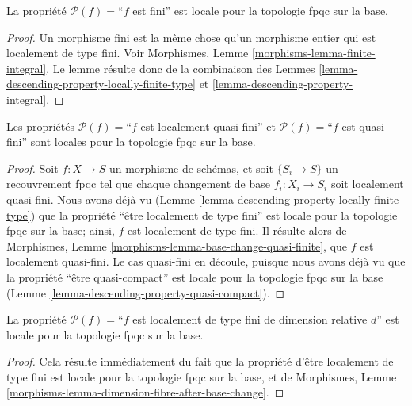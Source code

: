 \begin{lemma}
\label{lemma-descending-property-finite}
La propriété $\mathcal{P}(f) =$``$f$ est fini''
est locale pour la topologie fpqc sur la base.
\end{lemma}

\begin{proof}
Un morphisme fini est la même chose qu'un morphisme entier
qui est localement de type fini. Voir
Morphismes, Lemme \ref{morphisms-lemma-finite-integral}.
Le lemme résulte donc de la combinaison des
Lemmes \ref{lemma-descending-property-locally-finite-type}
et \ref{lemma-descending-property-integral}.
\end{proof}

\begin{lemma}
\label{lemma-descending-property-quasi-finite}
Les propriétés
$\mathcal{P}(f) =$``$f$ est localement quasi-fini''
et
$\mathcal{P}(f) =$``$f$ est quasi-fini''
sont locales pour la topologie fpqc sur la base.
\end{lemma}

\begin{proof}
Soit $f : X \to S$ un morphisme de schémas, et soit $\{S_i \to S\}$
un recouvrement fpqc tel que chaque changement de base
$f_i : X_i \to S_i$ soit localement quasi-fini.
Nous avons déjà vu
(Lemme \ref{lemma-descending-property-locally-finite-type})
que la propriété ``être localement de type fini'' est locale pour la topologie
fpqc sur la base; ainsi, $f$ est localement de type fini.
Il résulte alors de
Morphismes, Lemme \ref{morphisms-lemma-base-change-quasi-finite},
que $f$ est localement quasi-fini. Le cas quasi-fini en découle,
puisque nous avons déjà vu que la propriété ``être quasi-compact'' est locale
pour la topologie fpqc sur la base
(Lemme \ref{lemma-descending-property-quasi-compact}).
\end{proof}

\begin{lemma}
\label{lemma-descending-property-relative-dimension-d}
La propriété $\mathcal{P}(f) =$``$f$ est localement de type fini
de dimension relative $d$'' est locale pour la topologie fpqc sur la base.
\end{lemma}

\begin{proof}
Cela résulte immédiatement du fait que la propriété d'être localement de type
fini est locale pour la topologie fpqc sur la base, et de
Morphismes, Lemme \ref{morphisms-lemma-dimension-fibre-after-base-change}.
\end{proof}


